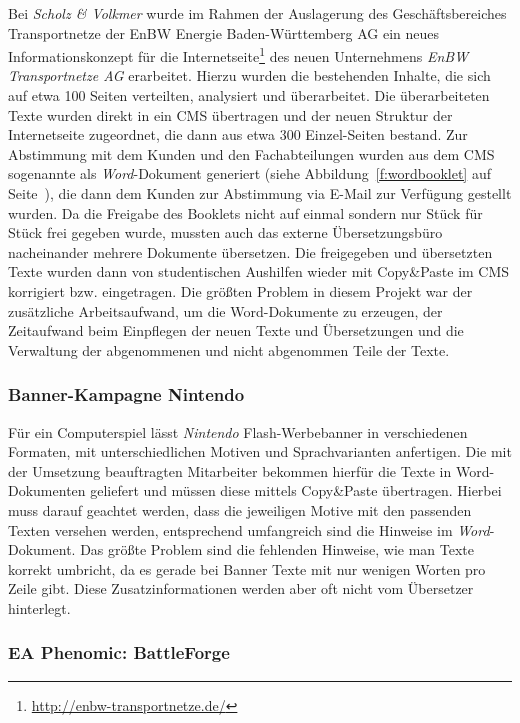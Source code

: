 Bei \emph{Scholz \& Volkmer} wurde im Rahmen der Auslagerung des Geschäftsbereiches Transportnetze der EnBW Energie Baden-Württemberg AG ein neues Informationskonzept für die Internetseite\footnote{\url{http://enbw-transportnetze.de/}} des neuen Unternehmens \emph{EnBW Transportnetze AG} erarbeitet. Hierzu wurden die bestehenden Inhalte, die sich auf etwa 100 Seiten verteilten, analysiert und überarbeitet. Die überarbeiteten Texte wurden direkt in ein CMS übertragen und der neuen Struktur der Internetseite zugeordnet, die dann aus etwa 300 Einzel-Seiten bestand. Zur Abstimmung mit dem Kunden und den Fachabteilungen wurden aus dem CMS sogenannte  als \emph{Word}-Dokument generiert (siehe Abbildung~\ref{f:wordbooklet} auf Seite~\pageref{f:wordbooklet}), die dann dem Kunden zur Abstimmung via E-Mail zur Verfügung gestellt wurden. Da die Freigabe des Booklets nicht auf einmal sondern nur Stück für Stück frei gegeben wurde, mussten auch das externe Übersetzungsbüro nacheinander mehrere Dokumente übersetzen. Die freigegeben und übersetzten Texte wurden dann von studentischen Aushilfen wieder mit Copy\&Paste im CMS korrigiert bzw. eingetragen. Die größten Problem in diesem Projekt war der zusätzliche Arbeitsaufwand, um die Word-Dokumente zu erzeugen, der Zeitaufwand beim Einpflegen der neuen Texte und Übersetzungen und die Verwaltung der abgenommenen und nicht abgenommen Teile der Texte.

\subsubsection{Banner-Kampagne Nintendo}

Für ein Computerspiel lässt \emph{Nintendo} Flash-Werbebanner in verschiedenen Formaten, mit unterschiedlichen Motiven und Sprachvarianten anfertigen. Die mit der Umsetzung beauftragten Mitarbeiter bekommen hierfür die Texte in Word-Dokumenten geliefert und müssen diese mittels Copy\&Paste übertragen. Hierbei muss darauf geachtet werden, dass die jeweiligen Motive mit den passenden Texten versehen werden, entsprechend umfangreich sind die Hinweise im \emph{Word}-Dokument. Das größte Problem sind die fehlenden Hinweise, wie man Texte korrekt umbricht, da es gerade bei Banner Texte mit nur wenigen Worten pro Zeile gibt. Diese Zusatzinformationen werden aber oft nicht vom Übersetzer hinterlegt.

\subsubsection{EA Phenomic: BattleForge}

